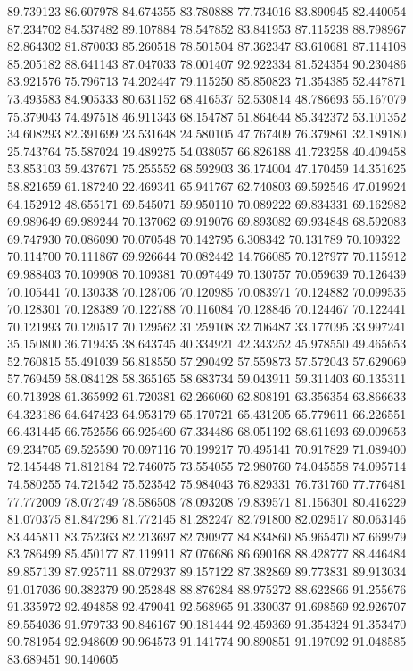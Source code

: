 89.739123
86.607978
84.674355
83.780888
77.734016
83.890945
82.440054
87.234702
84.537482
89.107884
78.547852
83.841953
87.115238
88.798967
82.864302
81.870033
85.260518
78.501504
87.362347
83.610681
87.114108
85.205182
88.641143
87.047033
78.001407
92.922334
81.524354
90.230486
83.921576
75.796713
74.202447
79.115250
85.850823
71.354385
52.447871
73.493583
84.905333
80.631152
68.416537
52.530814
48.786693
55.167079
75.379043
74.497518
46.911343
68.154787
51.864644
85.342372
53.101352
34.608293
82.391699
23.531648
24.580105
47.767409
76.379861
32.189180
25.743764
75.587024
19.489275
54.038057
66.826188
41.723258
40.409458
53.853103
59.437671
75.255552
68.592903
36.174004
47.170459
14.351625
58.821659
61.187240
22.469341
65.941767
62.740803
69.592546
47.019924
64.152912
48.655171
69.545071
59.950110
70.089222
69.834331
69.162982
69.989649
69.989244
70.137062
69.919076
69.893082
69.934848
68.592083
69.747930
70.086090
70.070548
70.142795
6.308342
70.131789
70.109322
70.114700
70.111867
69.926644
70.082442
14.766085
70.127977
70.115912
69.988403
70.109908
70.109381
70.097449
70.130757
70.059639
70.126439
70.105441
70.130338
70.128706
70.120985
70.083971
70.124882
70.099535
70.128301
70.128389
70.122788
70.116084
70.128846
70.124467
70.122441
70.121993
70.120517
70.129562
31.259108
32.706487
33.177095
33.997241
35.150800
36.719435
38.643745
40.334921
42.343252
45.978550
49.465653
52.760815
55.491039
56.818550
57.290492
57.559873
57.572043
57.629069
57.769459
58.084128
58.365165
58.683734
59.043911
59.311403
60.135311
60.713928
61.365992
61.720381
62.266060
62.808191
63.356354
63.866633
64.323186
64.647423
64.953179
65.170721
65.431205
65.779611
66.226551
66.431445
66.752556
66.925460
67.334486
68.051192
68.611693
69.009653
69.234705
69.525590
70.097116
70.199217
70.495141
70.917829
71.089400
72.145448
71.812184
72.746075
73.554055
72.980760
74.045558
74.095714
74.580255
74.721542
75.523542
75.984043
76.829331
76.731760
77.776481
77.772009
78.072749
78.586508
78.093208
79.839571
81.156301
80.416229
81.070375
81.847296
81.772145
81.282247
82.791800
82.029517
80.063146
83.445811
83.752363
82.213697
82.790977
84.834860
85.965470
87.669979
83.786499
85.450177
87.119911
87.076686
86.690168
88.428777
88.446484
89.857139
87.925711
88.072937
89.157122
87.382869
89.773831
89.913034
91.017036
90.382379
90.252848
88.876284
88.975272
88.622866
91.255676
91.335972
92.494858
92.479041
92.568965
91.330037
91.698569
92.926707
89.554036
91.979733
90.846167
90.181444
92.459369
91.354324
91.353470
90.781954
92.948609
90.964573
91.141774
90.890851
91.197092
91.048585
83.689451
90.140605

